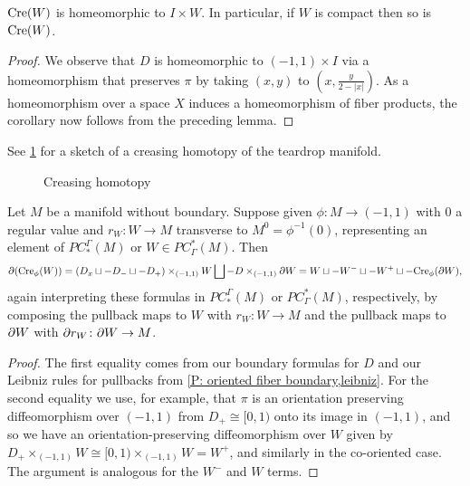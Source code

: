 \begin{corollary}
	$\mathrm{Cre}(W)$ is homeomorphic to $I \times W$. In particular, if $W$ is compact then so is $\mathrm{Cre}(W)$.
\end{corollary}

\begin{proof}
	We observe that $D$ is homeomorphic to $(-1,1) \times I$ via a homeomorphism that preserves $\pi$ by taking $(x,y)$ to $\left(x, \frac{y}{2-|x|}\right)$.
	As a homeomorphism over a space $X$ induces a homeomorphism of fiber products, the corollary now follows from the preceding lemma.
\end{proof}


See \cref{F: creasing} for a sketch of a creasing homotopy of the teardrop manifold.

\begin{figure}[h!]
	
	\caption{Creasing homotopy}
	\label{F: creasing}
\end{figure}

\begin{lemma}\label{E: bd crease}
	Let $M$ be a manifold without boundary.
	Suppose given $\phi \colon M \to (-1,1)$ with $0$ a regular value and $r_W \colon W \to M$ transverse to $M^0 = \phi^{-1}(0)$, representing an element of $PC^\Gamma_*(M)$ or $W \in PC_\Gamma^*(M)$.
	Then
\begin{equation*}
	\partial(\mathrm{Cre}_\phi(W)) = (D_x \sqcup -D_- \sqcup -D_+)\times_{(-1,1)} W \bigsqcup -D\times_{(-1,1)}\partial W = W \sqcup -W^- \sqcup -W^+ \sqcup -\mathrm{Cre}_\phi(\partial W),
\end{equation*}
	again interpreting these formulas in $PC^\Gamma_*(M)$ or $PC_\Gamma^*(M)$, respectively, by composing the pullback maps to $W$ with $r_W \colon W \to M$ and the pullback maps to $\partial W$ with $\partial r_W \colon \partial W \to M$.
\end{lemma}

\begin{proof}
The first equality comes from our boundary formulas for $D$ and our Leibniz rules for pullbacks from \cref{P: oriented fiber boundary,leibniz}.
For the second equality we use, for example, that $\pi$ is an orientation preserving diffeomorphism over $(-1,1)$ from $D_+ \cong [0,1)$ onto its image in $(-1,1)$, and so we have an orientation-preserving diffeomorphism over $W$ given by $D_+\times_{(-1,1)} W \cong [0,1)\times_{(-1,1)} W = W^+$, and similarly in the co-oriented case.
The argument is analogous for the $W^-$ and $W$ terms.
\end{proof}

